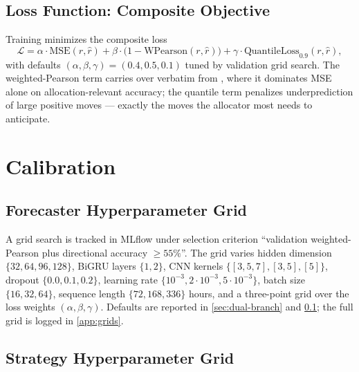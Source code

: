 \documentclass[11pt,a4paper]{article}
\begin{document}
\subsection{Loss Function: Composite Objective}
\label{sec:loss}

Training minimizes the composite loss
\begin{equation}
\mathcal L = \alpha \cdot \mathrm{MSE}(r,\hat r)
           + \beta  \cdot \bigl(1-\mathrm{WPearson}(r,\hat r)\bigr)
           + \gamma \cdot \mathrm{QuantileLoss}_{0.9}(r,\hat r),
\label{eq:loss}
\end{equation}
with defaults $(\alpha,\beta,\gamma)=(0.4,0.5,0.1)$ tuned by
validation grid search. The weighted-Pearson term carries over
verbatim from \cite{solovev2026lob}, where it dominates MSE alone on
allocation-relevant accuracy; the quantile term penalizes
underprediction of large positive moves --- exactly the moves the
allocator most needs to anticipate.



\section{Calibration}
\label{sec:calibration}

\subsection{Forecaster Hyperparameter Grid}
\label{sec:fcst-grid}

A grid search is tracked in MLflow under selection criterion
``validation weighted-Pearson plus directional accuracy $\ge 55\%$''.
The grid varies hidden dimension $\{32,64,96,128\}$, BiGRU layers
$\{1,2\}$, CNN kernels $\{[3,5,7],[3,5],[5]\}$, dropout
$\{0.0,0.1,0.2\}$, learning rate $\{10^{-3},2\!\cdot\!10^{-3},
5\!\cdot\!10^{-3}\}$, batch size $\{16,32,64\}$, sequence length
$\{72,168,336\}$ hours, and a three-point grid over the loss weights
$(\alpha,\beta,\gamma)$. Defaults are reported in
\cref{sec:dual-branch} and \cref{sec:loss}; the full grid is logged
in \cref{app:grids}.

\subsection{Strategy Hyperparameter Grid}
\label{sec:strat-grid}
\end{document}
